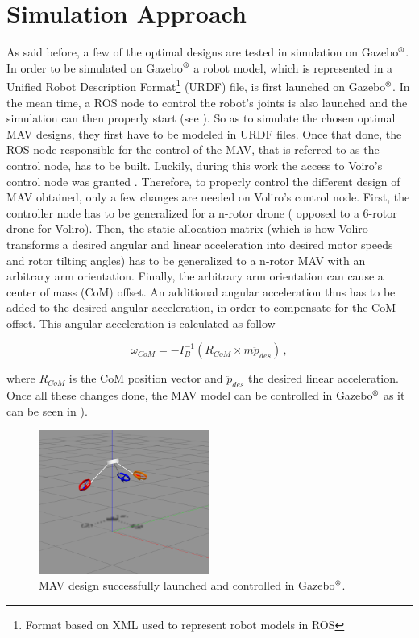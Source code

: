 \section{Simulation Approach}
\label{sec:control_approach}
As said before, a few of the optimal designs are tested in simulation on
Gazebo$^\textrm{\textregistered}$. In order to be simulated on
Gazebo$^\textrm{\textregistered}$ a robot model, which is represented
in a Unified Robot Description Format\footnote{Format based on XML used
to represent robot models in ROS} (URDF) file, is first launched on
Gazebo$^\textrm{\textregistered}$. In the mean time, a ROS node to control
the robot’s joints is also launched and the simulation can then properly start
(see ).
So as to simulate the chosen optimal MAV designs, they first have to be
modeled in URDF files. Once that done, the ROS node responsible for the
control of the MAV, that is referred to as the control node, has to be built.
Luckily, during this work the access to Voiro’s control node was granted
 \citep{kamel_voliro:_2018}. Therefore, to properly control the different
design of MAV obtained, only a few changes are needed on Voliro’s control
node. First, the controller node has to be generalized for a n-rotor drone (
opposed to a 6-rotor drone for Voliro). Then, the static allocation matrix
(which is how Voliro transforms a desired angular and linear acceleration into
desired motor speeds and rotor tilting angles)
has to be generalized to a n-rotor MAV with an arbitrary arm orientation.
Finally, the arbitrary arm orientation can cause a center of mass (CoM)
offset. An additional angular acceleration thus has to be added to the desired
angular acceleration, in order to compensate for the CoM offset. This
angular acceleration is calculated as follow

\begin{equation}
  \label{com_offset}
	\dot{\omega}_{CoM} = -I_B^{-1}(R_{CoM}\times m\ddot{p}_{des})\, ,
\end{equation}

where $R_{CoM}$ is the CoM position vector and $\ddot{p}_{des}$ the desired
linear acceleration.\\
Once all these changes done, the MAV model can be controlled in
Gazebo$^\textrm{\textregistered}$ as it can be seen in ).

\begin{figure}[!h]
  \centering
  \includegraphics[width=0.5\textwidth]{images/sim_gazebo.png}
  \caption{MAV design successfully launched and controlled in Gazebo$^\textrm{\textregistered}$.}
  \label{fig:sim_gazebo}
\end{figure}
